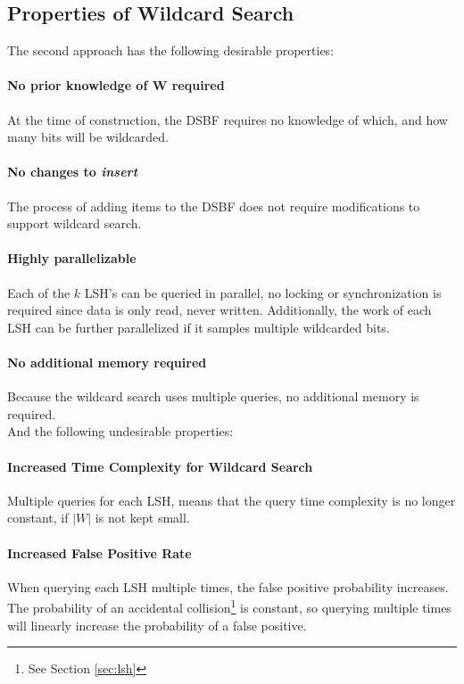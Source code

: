 \documentclass[a4paper,11pt]{article}
\begin{document}
\subsection{Properties of Wildcard Search}
The second approach has the following desirable properties:
\paragraph{No prior knowledge of W required} At the time of construction, the DSBF requires no knowledge of which, and how many bits will be wildcarded.

\paragraph{No changes to \emph{insert}} The process of adding items to the DSBF does not require modifications to support wildcard search.

\paragraph{Highly parallelizable} Each of the $k$ LSH's can be queried in parallel, no locking or synchronization is required since data is only read, never written. Additionally, the work of each LSH can be further parallelized if it samples multiple wildcarded bits.

\paragraph{No additional memory required} Because the wildcard search uses multiple queries, no additional memory is required.
\\

And the following undesirable properties:
\paragraph{Increased Time Complexity for Wildcard Search} Multiple queries for each LSH, means that the query time complexity is no longer constant, if $|W|$ is not kept small.

\paragraph{Increased False Positive Rate} When querying each LSH multiple times, the false positive probability increases. The probability of an accidental collision\footnote{See Section \ref{sec:lsh}} is constant, so querying multiple times will linearly increase the probability of a false positive.
\end{document}
